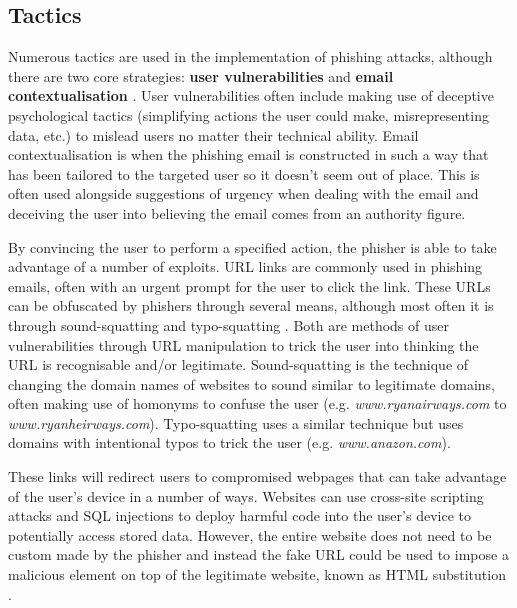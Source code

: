 \documentclass{l4proj}
\begin{document}
\subsection{Tactics}
\label{sec:other_tactics}
Numerous tactics are used in the implementation of phishing attacks, although there are two core strategies: \textbf{user vulnerabilities} and \textbf{email contextualisation} \citep{nicho2018evaluating}. User vulnerabilities often include making use of deceptive psychological tactics (simplifying actions the user could make, misrepresenting data, etc.) to mislead users no matter their technical ability. Email contextualisation is when the phishing email is constructed in such a way that has been tailored to the targeted user so it doesn't seem out of place. This is often used alongside suggestions of urgency when dealing with the email and deceiving the user into believing the email comes from an authority figure.

By convincing the user to perform a specified action, the phisher is able to take advantage of a number of exploits. URL links are commonly used in phishing emails, often with an urgent prompt for the user to click the link. These URLs can be obfuscated by phishers through several means, although most often it is through sound-squatting and typo-squatting \citep{chiew2018survey}. Both are methods of user vulnerabilities through URL manipulation to trick the user into thinking the URL is recognisable and/or legitimate. Sound-squatting is the technique of changing the domain names of websites to sound similar to legitimate domains, often making use of homonyms to confuse the user (e.g. \textit{www.ryanairways.com} to \textit{www.ryanheirways.com}). Typo-squatting uses a similar technique but uses domains with intentional typos to trick the user (e.g. \textit{www.anazon.com}).

These links will redirect users to compromised webpages that can take advantage of the user’s device in a number of ways. Websites can use cross-site scripting attacks and SQL injections to deploy harmful code into the user’s device to potentially access stored data. However, the entire website does not need to be custom made by the phisher and instead the fake URL could be used to impose a malicious element on top of the legitimate website, known as HTML substitution \citep{chiew2018survey}.
\end{document}
